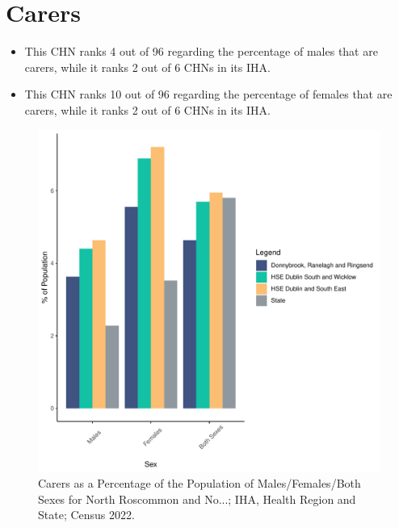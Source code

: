 \documentclass{article}
\begin{document}
\section{Carers}\label{sect:Carers}
\begin{itemize}
\item This CHN ranks  4 out of 96 regarding the percentage of males that are carers, while it ranks   2 out of 6 CHNs in its IHA.
\item This CHN ranks  10 out of 96 regarding the percentage of females that are carers, while it ranks   2 out of 6 CHNs in its IHA.
\end{itemize}
\begin{figure}[H]
	\centering
	\includegraphics[width = 150mm]{../figures/CareED.pdf}
	\caption{Carers as a Percentage of the Population of Males/Females/Both Sexes for North Roscommon and No...; IHA, Health Region and State; Census 2022.}
	\label{fig:2ae19629-1a6a-13a3-e055-000000000001}
	\end{figure}
\end{document}
